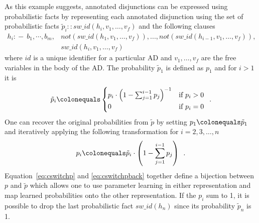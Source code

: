 \documentclass[a4paper]{article}
\begin{document}
As this example suggests,
annotated disjunctions can be expressed using probabilistic facts by representing each annotated disjunction using the set of probabilistic facts $\tilde p_i::sw\_id(h_i,v_1,\ldots,v_f)$ and  the following clauses 
\begin{align}
\label{eq:cswitch}
h_i :\!\!-\ b_1, \cdots , b_m, &not(sw\_id(h_1,v_1,\ldots,v_f)), ..., not(sw\_id(h_{i-1},v_1,\ldots,v_f)),\nonumber\\ &sw\_id(h_i,v_1,\ldots,v_f)
\end{align}
where $id$ is a unique identifier  for a particular AD and $v_1,\ldots,v_f$ are the free variables in the body of the AD. The probability $\tilde p_1$ is defined as $p_1$ and for $i>1$ it is
\begin{equation}
\label{eq:cswitchp}
\tilde p_i \colonequals \begin{cases}
  p_i \cdot\left (1- \sum_{j=1}^{i-1} p_j\right) ^{-1} &\text{if } p_i>0\\
  0  & \text{if }p_i=0
  \end{cases} \enspace .
\end{equation}
One can recover the original probabilities from $\tilde p$ by setting $p_1 \colonequals \tilde p_1$ and iteratively applying the following transformation for $i=2,3,\ldots,n$
\begin{equation}
\label{eq:cswitchpback}
p_i \colonequals  \tilde p_i \cdot\left (1- \sum_{j=1}^{i-1} p_j\right)\enspace.
\end{equation}
Equation~\eqref{eq:cswitchp} and \eqref{eq:cswitchpback} together define a bijection between $p$ and $\tilde p$ which allows one to use parameter learning in either representation and map learned probabilities onto the other representation. If the $p_i$ sum to 1, it is possible to drop the last probabilistic fact $sw\_id(h_n)$ since its probability $\tilde p_n$ is 1. 
\end{document}
